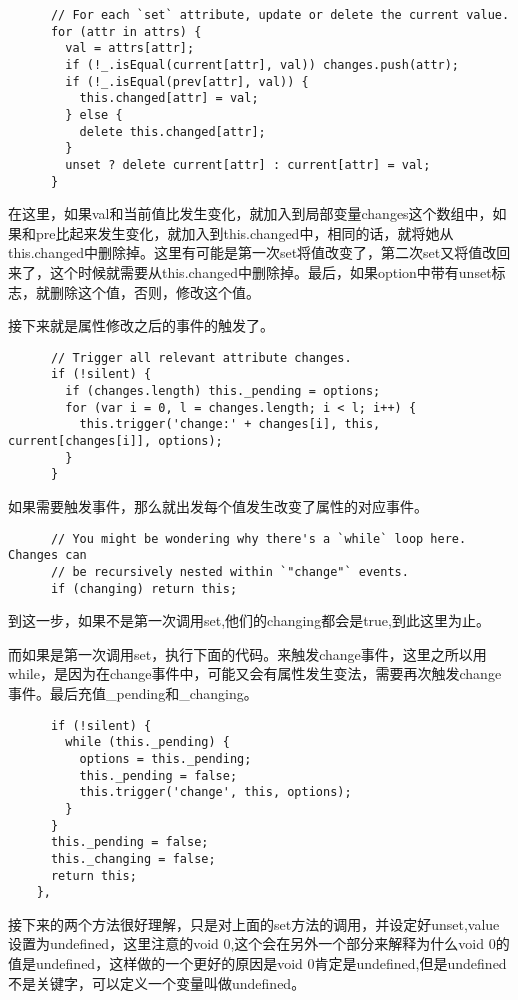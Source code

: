   \begin{lstlisting}
      // For each `set` attribute, update or delete the current value.
      for (attr in attrs) {
        val = attrs[attr];
        if (!_.isEqual(current[attr], val)) changes.push(attr);
        if (!_.isEqual(prev[attr], val)) {
          this.changed[attr] = val;
        } else {
          delete this.changed[attr];
        }
        unset ? delete current[attr] : current[attr] = val;
      }
  \end{lstlisting}

  在这里，如果val和当前值比发生变化，就加入到局部变量changes这个数组中，如果和pre比起来发生变化，就加入到this.changed中，相同的话，就将她从this.changed中删除掉。这里有可能是第一次set将值改变了，第二次set又将值改回来了，这个时候就需要从this.changed中删除掉。最后，如果option中带有unset标志，就删除这个值，否则，修改这个值。

  接下来就是属性修改之后的事件的触发了。
 
  \begin{lstlisting}
      // Trigger all relevant attribute changes.
      if (!silent) {
        if (changes.length) this._pending = options;
        for (var i = 0, l = changes.length; i < l; i++) {
          this.trigger('change:' + changes[i], this, current[changes[i]], options);
        }
      }
  \end{lstlisting}
  如果需要触发事件，那么就出发每个值发生改变了属性的对应事件。
  \begin{lstlisting}
      // You might be wondering why there's a `while` loop here. Changes can
      // be recursively nested within `"change"` events.
      if (changing) return this;
  \end{lstlisting}
  到这一步，如果不是第一次调用set,他们的changing都会是true,到此这里为止。

  而如果是第一次调用set，执行下面的代码。来触发change事件，这里之所以用while，是因为在change事件中，可能又会有属性发生变法，需要再次触发change事件。最后充值\_pending和\_changing。
  \begin{lstlisting}
      if (!silent) {
        while (this._pending) {
          options = this._pending;
          this._pending = false;
          this.trigger('change', this, options);
        }
      }
      this._pending = false;
      this._changing = false;
      return this;
    },

  \end{lstlisting}

  接下来的两个方法很好理解，只是对上面的set方法的调用，并设定好unset,value设置为undefined，这里注意的void 0,这个会在另外一个部分来解释为什么void 0的值是undefined，这样做的一个更好的原因是void 0肯定是undefined,但是undefined不是关键字，可以定义一个变量叫做undefined。

